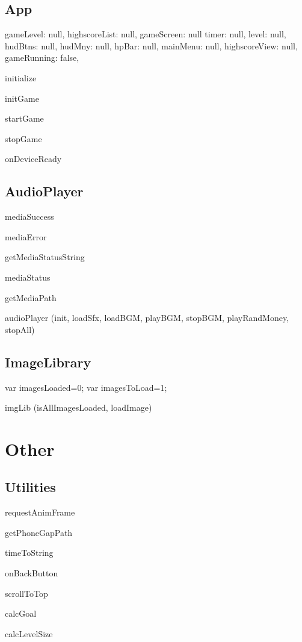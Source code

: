 \subsection*{App}

	gameLevel: null,
  	highscoreList: null,
  	gameScreen: null
  	timer: null,
  	level: null,
  	hudBtns: null,
  	hudMny: null,
  	hpBar: null,
  	mainMenu: null,
  	highscoreView: null,
  	gameRunning: false,

  	initialize

  	initGame

  	startGame

  	stopGame

  	onDeviceReady

\subsection*{AudioPlayer}

	mediaSuccess

	mediaError

	getMediaStatusString

	mediaStatus

	getMediaPath

	audioPlayer (init, loadSfx, loadBGM, playBGM, stopBGM, playRandMoney, stopAll)

\subsection*{ImageLibrary}
	
	var imagesLoaded=0;
	var imagesToLoad=1;

	imgLib (isAllImagesLoaded, loadImage)	

\clearpage

\section{Other}

\subsection*{Utilities}

	requestAnimFrame

	getPhoneGapPath

	timeToString

	onBackButton

	scrollToTop

	calcGoal

	calcLevelSize

